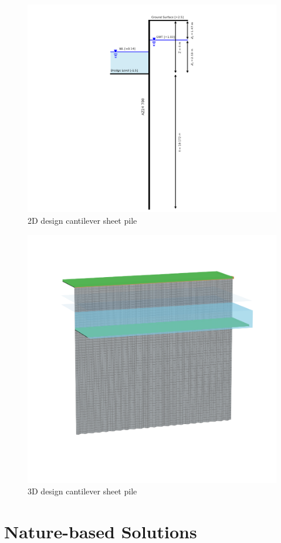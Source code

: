 \begin{figure}[H]
    \centering
    \includegraphics[width=0.90\linewidth]{figures/ch8/final_design.png}
    \caption{2D design cantilever sheet pile}
    \label{fig:final_design}
\end{figure}

\begin{figure}[H]
    \centering
    \includegraphics[width=0.70\linewidth]{figures/ch8/3D_final_desgin.png}
    \caption{3D design cantilever sheet pile}
    \label{fig:3D_final_design}
\end{figure}

\section{Nature-based Solutions}

